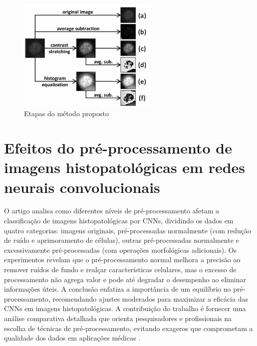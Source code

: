 \begin{figure}[H]
    \centering
    \caption{\label{fig:preprocessing_rodrigues2020comparing}Etapas do método proposto}
    \includegraphics[width=0.6\textwidth]{img/trabalhos_relacionados/preprocessing_rodrigues2020comparing.png}
\end{figure}

\section{Efeitos do pré-processamento de imagens histopatológicas em redes neurais convolucionais}
O artigo analisa como diferentes níveis de pré-processamento afetam a classificação de imagens histopatológicas por CNNs, dividindo os dados em quatro categorias: imagens originais, pré-processadas normalmente (com redução de ruído e aprimoramento de células), outras pré-processadas normalmente e excessivamente pré-processadas (com operações morfológicas adicionais). Os experimentos revelam que o pré-processamento normal melhora a precisão ao remover ruídos de fundo e realçar características celulares, mas o excesso de processamento não agrega valor e pode até degradar o desempenho ao eliminar informações úteis. A conclusão enfatiza a importância de um equilíbrio no pré-processamento, recomendando ajustes moderados para maximizar a eficácia das CNNs em imagens histopatológicas. A contribuição do trabalho é fornecer uma análise comparativa detalhada que orienta pesquisadores e profissionais na escolha de técnicas de pré-processamento, evitando exageros que comprometam a qualidade dos dados em aplicações médicas \cite{ozturk2018histopathological}.

